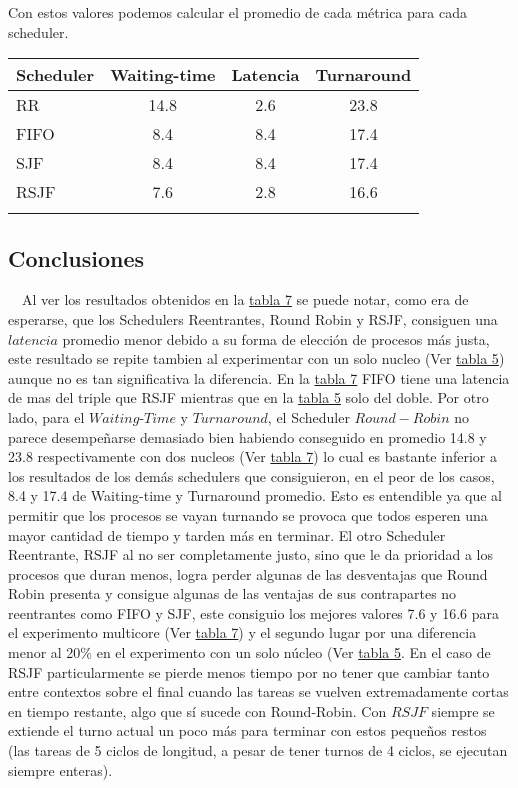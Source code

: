Con estos valores podemos calcular el promedio de cada métrica para cada scheduler.

\begin{center}
        \begin{tabular}{| l | c | c | c |}
                \hline
    Scheduler & Waiting-time & Latencia & Turnaround \\
                \hline
    RR   &    14.8 &  2.6 & 23.8 \\
    FIFO &     8.4 &  8.4 & 17.4 \\
    SJF  &     8.4 &  8.4 & 17.4 \\
    RSJF &     7.6 &  2.8 & 16.6 \\
                \hline
	\label{tab:tabla7}
        \end{tabular}
\end{center}

\subsection{Conclusiones}

\ \ Al ver los resultados obtenidos en la \hyperref[tab:tabla7]{tabla 7} se puede notar, como era de esperarse, que los Schedulers Reentrantes, Round Robin y RSJF, consiguen una $latencia$ promedio menor debido a su forma de elección de procesos más justa, este resultado se repite tambien al experimentar con un solo nucleo (Ver \hyperref[tab:tabla5]{tabla 5}) aunque no es tan significativa la diferencia. En la \hyperref[tab:tabla7]{tabla 7} FIFO tiene una latencia de mas del triple que RSJF mientras que en la \hyperref[tab:tabla5]{tabla 5} solo del doble. Por otro lado, para el $Waiting$-$Time$ y $Turnaround$, el Scheduler $Round-Robin$ no parece desempeñarse demasiado bien habiendo conseguido en promedio 14.8 y 23.8 respectivamente con dos nucleos (Ver \hyperref[tab:tabla7]{tabla 7}) lo cual es bastante inferior a los resultados de los demás schedulers que consiguieron, en el peor de los casos, 8.4 y 17.4 de Waiting-time y Turnaround promedio. Esto es entendible ya que al permitir que los procesos se vayan turnando se provoca que todos esperen una mayor cantidad de tiempo y tarden más en terminar. El otro Scheduler Reentrante, RSJF al no ser completamente justo, sino que le da prioridad a los procesos que duran menos, logra perder algunas de las desventajas que Round Robin presenta y consigue algunas de las ventajas de sus contrapartes no reentrantes como FIFO y SJF, este consiguio los mejores valores 7.6 y 16.6 para el experimento multicore (Ver \hyperref[tab:tabla7]{tabla 7}) y el segundo lugar por una diferencia menor al 20\% en el experimento con un solo núcleo (Ver \hyperref[tab:tabla5]{tabla 5}. En el caso de RSJF particularmente se pierde menos tiempo por no tener que cambiar tanto entre contextos sobre el final cuando las tareas se vuelven extremadamente cortas en tiempo restante, algo que sí sucede con Round-Robin. Con $RSJF$ siempre se extiende el turno actual un poco más para terminar con estos pequeños restos (las tareas de 5 ciclos de longitud, a pesar de tener turnos de 4 ciclos, se ejecutan siempre enteras).

